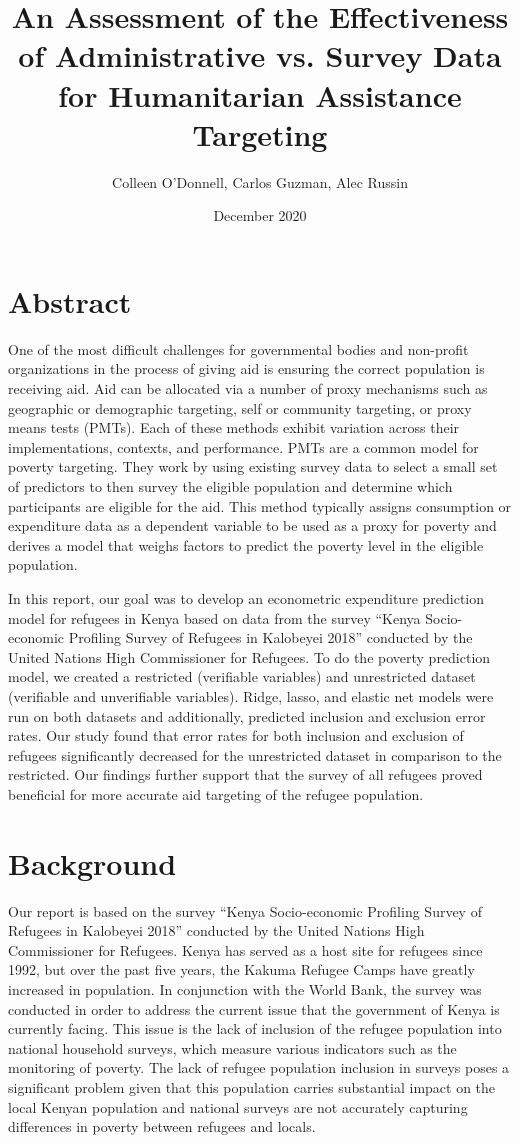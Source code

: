 \documentclass{article}
\title{An Assessment of the Effectiveness of Administrative vs. Survey Data for Humanitarian Assistance Targeting}
\author{Colleen O'Donnell, Carlos Guzman, Alec Russin}
\date{December 2020}
\begin{document}
\maketitle
\section{Abstract}

One of the most difficult challenges for governmental bodies and non-profit organizations in the process of giving aid is ensuring the correct population is receiving aid. Aid can be allocated via a number of proxy mechanisms such as geographic or demographic targeting, self or community targeting, or proxy means tests (PMTs). Each of these methods exhibit variation across their implementations, contexts, and performance. PMTs are a common model for poverty targeting. They work by using existing survey data to select a small set of predictors to then survey the eligible population and determine which participants are eligible for the aid. This method typically assigns consumption or expenditure data as a dependent variable to be used as a proxy for poverty and derives a model that weighs factors to predict the poverty level in the eligible population. 
 
In this report, our goal was to develop an econometric expenditure prediction model for refugees in Kenya based on data from the survey “Kenya Socio-economic Profiling Survey of Refugees in Kalobeyei 2018” conducted by the United Nations High Commissioner for Refugees. To do the poverty prediction model, we created a restricted (verifiable variables) and unrestricted dataset (verifiable and unverifiable variables). Ridge, lasso, and elastic net models were run on both datasets and additionally, predicted inclusion and exclusion error rates. Our study found that error rates for both inclusion and exclusion of refugees significantly decreased for the unrestricted dataset in comparison to the restricted. Our findings further support that the survey of all refugees proved beneficial for more accurate aid targeting of the refugee population.

\newpage
\section{Background}
Our report is based on the survey “Kenya Socio-economic Profiling Survey of Refugees in Kalobeyei 2018” conducted by the United Nations High Commissioner for Refugees. Kenya has served as a host site for refugees since 1992, but over the past five years, the Kakuma Refugee Camps have greatly increased in population. In conjunction with the World Bank, the survey was conducted in order to address the current issue that the government of Kenya is currently facing. This issue is the lack of inclusion of the refugee population into national household surveys, which measure various indicators such as the monitoring of poverty. The lack of refugee population inclusion in surveys poses a significant problem given that this population carries substantial impact on the local Kenyan population and national surveys are not accurately capturing differences in poverty between refugees and locals. 
\end{document}

